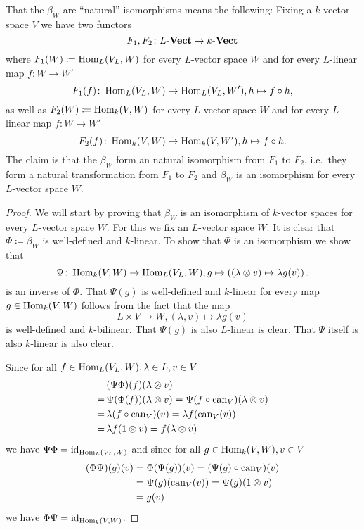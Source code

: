 That the $\beta_W$ are ``natural'' isomorphisms means the following: Fixing a $k$-vector space $V$ we have two functors
\[
 F_1, F_2 \colon L\text{-}\mathbf{Vect} \to k\text{-}\mathbf{Vect}
\]
where $F_1(W) \coloneqq \operatorname{Hom}_L(V_L,W)$ for every $L$-vector space $W$ and for every $L$-linear map $f \colon W \to W'$
\[
 F_1(f) \colon \operatorname{Hom}_L(V_L, W) \to \operatorname{Hom}_L(V_L, W'), h \mapsto f \circ h,
\]
as well as $F_2(W) \coloneqq \operatorname{Hom}_k(V,W)$ for every $L$-vector space $W$ and for every $L$-linear map $f \colon W \to W'$
\[
 F_2(f) \colon \operatorname{Hom}_k(V,W) \to \operatorname{Hom}_k(V,W'), h \mapsto f \circ h.
\]
The claim is that the $\beta_W$ form an natural isomorphism from $F_1$ to $F_2$, i.e.\ they form a natural transformation from $F_1$ to $F_2$ and $\beta_W$ is an isomorphism for every $L$-vector space $W$.


\begin{proof}
 We will start by proving that $\beta_W$ is an isomorphism of $k$-vector spaces for every $L$-vector space $W$. For this we fix an $L$-vector space $W$. It is clear that $\Phi \coloneqq \beta_W$ is well-defined and $k$-linear. To show that $\Phi$ is an isomorphism we show that
 \[
  \Psi \colon \operatorname{Hom}_k(V,W) \to \operatorname{Hom}_L(V_L, W), g \mapsto \left( (\lambda \otimes v) \mapsto \lambda g(v) \right).
 \]
 is an inverse of $\Phi$. That $\Psi(g)$ is well-defined and $k$-linear for every map \mbox{$g \in \operatorname{Hom}_k(V,W)$} follows from the fact that the map
 \[
  L \times V \to W, (\lambda, v) \mapsto \lambda g(v)
 \]
 is well-defined and $k$-bilinear. That $\Psi(g)$ is also $L$-linear is clear. That $\Psi$ itself is also $k$-linear is also clear.
 
 Since for all $f \in \operatorname{Hom}_L(V_L,W), \lambda \in L, v \in V$
 \begin{align*}
   &\,(\Psi \Phi)(f)(\lambda \otimes v) \\
  =&\,\Psi(\Phi(f))(\lambda \otimes v)
  =   \Psi(f \circ \operatorname{can}_V)(\lambda \otimes v) \\
  =&\,\lambda (f \circ \operatorname{can}_V)(v)
  =   \lambda f(\operatorname{can}_V(v)) \\
  =&\,\lambda f(1 \otimes v)
  =   f (\lambda \otimes v)
 \end{align*}
 we have $\Psi \Phi = \operatorname{id}_{\operatorname{Hom}_L(V_L, W)}$ and since for all $g \in \operatorname{Hom}_k(V,W), v \in V$
 \begin{align*}
  (\Phi \Psi)(g)(v)
  &= \Phi(\Psi(g))(v)
  = (\Psi(g) \circ \operatorname{can}_V)(v) \\
  &= \Psi(g)(\operatorname{can}_V(v))
  = \Psi(g)(1 \otimes v) \\
  &= g(v)
 \end{align*}
 we have $\Phi \Psi = \operatorname{id}_{\operatorname{Hom}_k(V,W)}$.
 

\end{proof}
